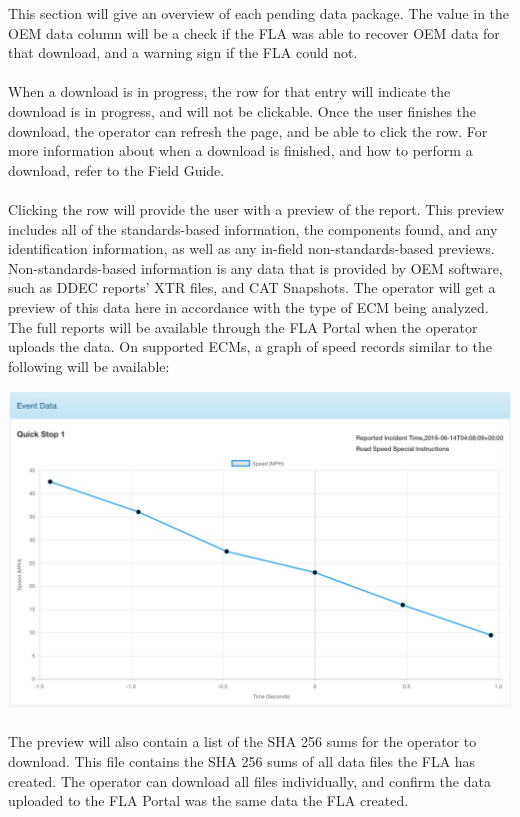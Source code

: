 \documentclass[11pt, oneside]{book}
\begin{document}
This section will give an overview of each pending data package. The value in the
OEM data column will be a check if the FLA was able to recover OEM
data for that download, and a warning sign if the FLA could not.
\paragraph{  }
When a download is in progress, the row for that entry will indicate the download is in progress, and will not be clickable. Once the user finishes the download, the operator can refresh the page, and be able to click the row. For more information about when a download is finished, and how to perform a download, refer to the Field Guide.
\paragraph{  }
Clicking the row will provide the user with a preview of the report. This preview includes all of the standards-based information, the components found, and any identification information, as well as any in-field non-standards-based previews. Non-standards-based information is any data that is provided by OEM software, such as DDEC reports' XTR files, and CAT Snapshots. The operator will get a preview of this data here in accordance with the type of ECM being analyzed. The full reports will be available through the FLA Portal when the operator uploads the data. On supported ECMs, a graph of speed records similar to the following will be available:
\\[\baselineskip]
\begin{center}
	\includegraphics[width=.9\linewidth]{../media/fla_preview_screenshots/event_graph}
\end{center}

\paragraph{  }
The preview will also contain a list of the SHA 256 sums for the operator
to download. This file contains the SHA 256 sums of all data files
the FLA has created. The operator can download all files individually, and confirm
the data uploaded to the FLA Portal was the same data the FLA created.
\end{document}
